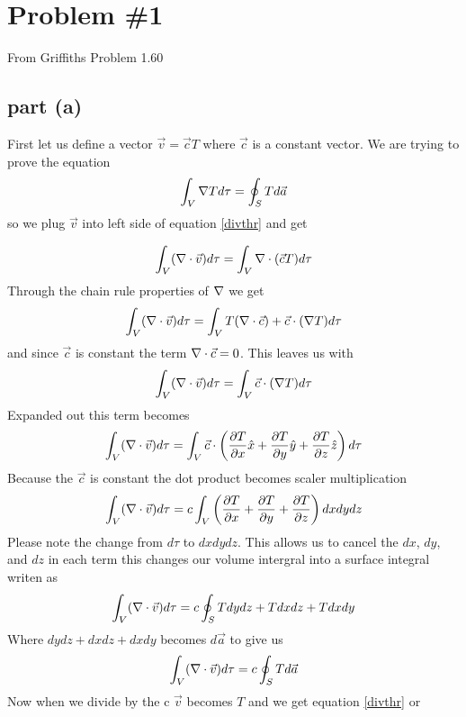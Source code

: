 \documentclass[11pt]{article}
\numberwithin{equation}{section}
\newcommand{\grad}{\bold\nabla}
\newcommand{\vc}{\vec{c}}
\newcommand{\partx}{\frac{\partial T}{\partial x}}
\newcommand{\party}{\frac{\partial T}{\partial y}}
\newcommand{\partz}{\frac{\partial T}{\partial z}}
\begin{document}


\section{Problem \#1}
From Griffiths Problem 1.60
\subsection{part (a)}
First let us define a vector $\vec{v} = \vec{c}T$ where $\vec{c}$ is a constant vector. We are trying to prove the equation
\begin{equation}
\int_V \grad T d\tau = \oint_S T d\vec{a}
\label{divthr}
\end{equation}
so we plug $\vec{v}$ into left side of equation \ref{divthr} and get

$$\int_V (\grad \cdot \vec{v}) d\tau = \int_V \grad \cdot (\vc T) d\tau$$
Through the chain rule properties of $\grad$ we get
$$\int_V (\grad \cdot \vec{v}) d\tau = \int_V T(\grad \cdot \vc) + \vc \cdot(\grad T) d\tau$$
and since $\vc$ is constant the term $\grad \cdot \vc = 0$. This leaves us with
$$\int_V (\grad \cdot \vec{v}) d\tau = \int_V \vc \cdot(\grad T) d\tau$$
Expanded out this term becomes
$$\int_V (\grad \cdot \vec{v}) d\tau = \int_V \vc \cdot\left(\partx \hat{x} + \party \hat{y} + \partz \hat{z}\right) d\tau$$
Because the $\vc$ is constant the dot product becomes scaler multiplication
$$\int_V (\grad \cdot \vec{v}) d\tau = c \int_V \left(\partx + \party + \partz\right) dx dy dz$$
Please note the change from $d\tau$ to $dxdydz$. This allows us to cancel the $dx$, $dy$, and $dz$ in each term this changes our volume intergral into a surface integral writen as
$$\int_V (\grad \cdot \vec{v}) d\tau = c \oint_S T dydz + Tdxdz + Tdxdy$$
Where $dydz+dxdz+dxdy$ becomes $d\vec{a}$ to give us
$$\int_V (\grad \cdot \vec{v}) d\tau = c \oint_S T d\vec{a}$$
Now when we divide by the c $\vec{v}$ becomes $T$ and we get equation \ref{divthr} or
\begin{center}
\fbox{$\int_V \grad T d\tau = \oint_S T d\vec{a}$}
\end{center}
\end{document}
